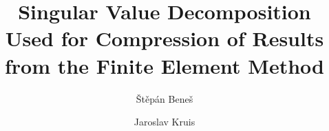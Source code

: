 \documentclass[preprint,12pt]{elsarticle}
\begin{document}
\begin{frontmatter}


\title{Singular Value Decomposition Used for Compression of Results from the Finite Element Method}




\author{\v St\v ep\'an Bene\v s} %
\author{Jaroslav Kruis}

\address{Department of Mechanics, Faculty of Civil Engineering, Czech Technical University in Prague Th\'akurova 7, Prague 166 29, Czech Republic}


\end{frontmatter}
\end{document}
